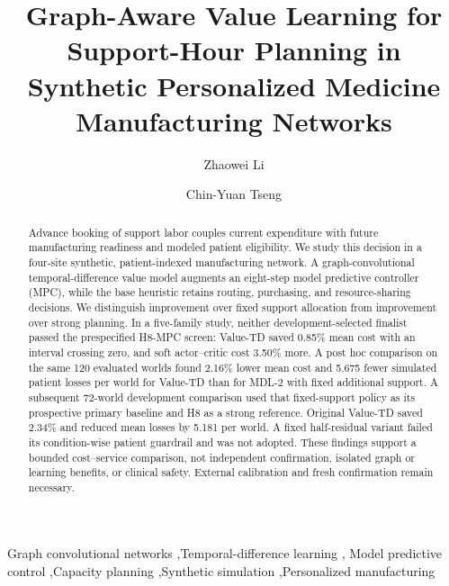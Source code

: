 \documentclass[preprint,review,12pt]{elsarticle}
\begin{document}
\begin{frontmatter}

\title{Graph-Aware Value Learning for Support-Hour Planning in Synthetic Personalized Medicine Manufacturing Networks}

\author[inst1]{Zhaowei Li}
\author[inst1]{Chin-Yuan Tseng}

\begin{abstract}
Advance booking of support labor couples current expenditure with future
manufacturing readiness and modeled patient eligibility. We study this
decision in a four-site synthetic, patient-indexed manufacturing network.
A graph-convolutional temporal-difference value model augments an eight-step
model predictive controller (MPC), while the base heuristic retains routing,
purchasing, and resource-sharing decisions. We distinguish improvement over
fixed support allocation from improvement over strong planning. In a
five-family study, neither development-selected finalist passed the
prespecified H8-MPC screen: Value-TD saved 0.85\% mean cost with an interval
crossing zero, and soft actor--critic cost 3.50\% more. A post hoc comparison
on the same 120 evaluated worlds found 2.16\% lower mean cost and 5.675
fewer simulated patient losses per world for Value-TD than for MDL-2 with
fixed additional support. A subsequent 72-world development comparison
used that fixed-support policy as its prospective primary baseline and H8
as a strong reference. Original Value-TD saved 2.34\% and reduced mean
losses by 5.181 per world. A fixed half-residual variant failed its
condition-wise patient guardrail and was not adopted. These findings
support a bounded cost--service comparison, not independent confirmation,
isolated graph or learning benefits, or clinical safety. External
calibration and fresh confirmation remain necessary.
\end{abstract}

\begin{keyword}
Graph convolutional networks \sep Temporal-difference learning \sep
Model predictive control \sep Capacity planning \sep Synthetic simulation
\sep Personalized manufacturing
\end{keyword}
\end{frontmatter}
\linenumbers
\end{document}
